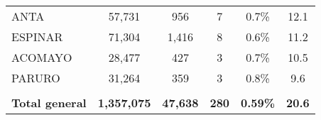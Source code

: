 \begin{tabular}{lccccc}
	\cellcolor[HTML]{FFFF99}ANTA                                    & 57,731               & 956                                  & 7                    & 0.7\%                      & 12.1                                        \\
	\cellcolor[HTML]{FFFF99}ESPINAR                                 & 71,304               & 1,416                                & 8                    & 0.6\%                      & 11.2                                        \\
	\cellcolor[HTML]{FFFF99}ACOMAYO                                 & 28,477               & 427                                  & 3                    & 0.7\%                      & 10.5                                        \\
	\cellcolor[HTML]{FFFF99}PARURO                                  & 31,264               & 359                                  & 3                    & 0.8\%                      & 9.6                                         \\
	& \multicolumn{1}{l}{} & \multicolumn{1}{l}{}                 & \multicolumn{1}{l}{} & \multicolumn{1}{l}{}       & \multicolumn{1}{l}{}                        \\
	\rowcolor[HTML]{DDEBF7} 
	\textbf{Total general}                                          & \textbf{1,357,075}   & \textbf{47,638}                      & \textbf{280}         & \textbf{0.59\%}            & \textbf{20.6}                              
\end{tabular}

